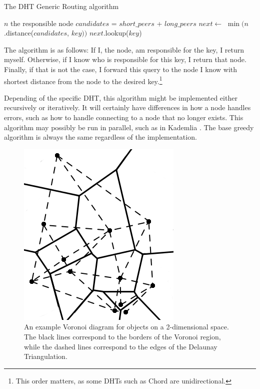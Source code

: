 \begin{algorithm}
	\caption{The DHT Generic Routing algorithm}
	\label{alg:routing}
	\small
	\begin{algorithmic}[1]
				\State \Return $ n $
			\EndIf
				\State \Return the responsible node
			\EndIf
			\State $ candidates $ = $ short\_peers $ + $ long\_peers $
			\State $ next  \leftarrow $  $\min (n$.distance($candidates$, $ key ))$
			\State \Return $next.$lookup($key$)
		\EndFunction
	\end{algorithmic}
	
	\scriptsize
\end{algorithm}
The algorithm is as follows:
If I, the node, am responsible for the key, I return myself.
Otherwise, if I know who is responsible for this key, I return that node.
Finally, if that is not the case, I forward this query to the node I know with shortest distance from the node to the desired key.\footnote{This order matters, as some DHTs such as Chord are unidirectional.} 

Depending of the specific DHT, this algorithm might be implemented either recursively or iteratively.
It will certainly have differences in how a node handles errors, such as how to handle connecting to a node that no longer exists.
This algorithm may possibly be run in parallel, such as in Kademlia \cite{kademlia}.
The base greedy algorithm is always the same regardless of the implementation.


\begin{figure}
	\centering
	\includegraphics[width=0.75\linewidth]{figs/voronoi}
	\caption{An example Voronoi diagram for objects on a 2-dimensional space.  The black lines correspond to the borders of the Voronoi region, while the dashed lines correspond to the edges of the Delaunay Triangulation.}
	\label{fig:voro-ex}
\end{figure}


